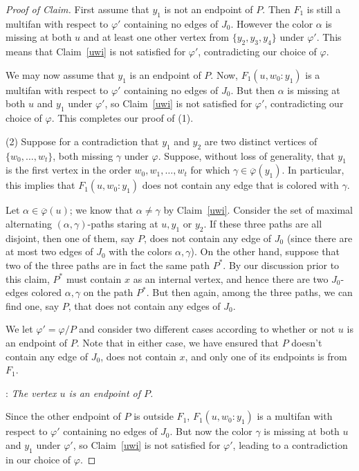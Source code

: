 \documentclass[11pt, oneside]{article}
\newcommand{\pbar}{\overline{\varphi}}
\newenvironment{proofc}{\begin{proof}[Proof of Claim]}{\end{proof}}
\begin{document}
\begin{proofc}
First assume that $y_1$ is not an endpoint of $P$. Then $F_1$ is still a multifan with respect to $\varphi'$ containing no edges of $J_0$. However the color  $\alpha$ is missing at both $u$ and at least one other vertex from $\{y_2, y_3, y_4\}$ under $\varphi'$. This means that Claim~\ref{uwi} is not satisfied for $\varphi'$, contradicting our choice of $\varphi$.

We may now assume that $y_1$ is an endpoint of $P$. Now, $F_1(u, w_0:y_1)$ is a multifan with respect to $\varphi'$ containing no edges of $J_0$. But then $\alpha$ is missing at both $u$ and $y_1$ under $\varphi'$, so Claim~\ref{uwi} is not satisfied for $\varphi'$, contradicting our choice of $\varphi$.  This completes our proof of (1).

\noindent (2) Suppose for a contradiction that $y_1$ and $y_2$ are two distinct vertices of $\{w_0, \ldots, w_t\}$, both missing $\gamma$ under $\varphi$. Suppose, without loss of generality, that $y_1$ is the first vertex 
in the order $w_0, w_1, \ldots, w_t$ for which $\gamma\in \pbar(y_1)$. In particular, this implies that $F_1(u, w_0:y_1)$ does not contain any edge that is colored with $\gamma$.  

Let $\alpha\in \pbar(u)$; we know that $\alpha\ne \gamma$ by Claim~\ref{uwi}. Consider the set of  maximal alternating $(\alpha, \gamma)$-paths staring at $u, y_1$ or $y_2$. If these three paths are all disjoint, 
then one of them, say $P$,  does not contain any edge of $J_0$ (since there are at most two edges of $J_0$ with the colors $\alpha, \gamma$). On the other hand, suppose that two of the three paths are in fact the same path $P^*$. By our discussion prior to this claim, $P^*$ must contain $x$ as an internal vertex, and hence there are two $J_0$-edges colored $\alpha, \gamma$ on the path $P^*$. But then again, among the three paths, we can find one, say $P$, that does not contain any edges of $J_0$.

We let $\varphi'=\varphi/P$ and consider two different cases according to whether or not $u$ is an endpoint of $P$. Note that in either case, we have ensured that $P$ doesn't contain any edge of $J_0$, does not contain $x$, and only one of its endpoints is from $F_1$.


:  \emph{The vertex $u$ is an endpoint of $P$.}

Since the other endpoint of $P$ is outside $F_1$, $F_1(u, w_0:y_1)$ is a multifan with respect to $\varphi'$ containing no edges of $J_0$. But now the color $\gamma$ is missing at both $u$ and $y_1$ under $\varphi'$, so Claim~\ref{uwi} is not satisfied for $\varphi'$, leading to a contradiction in our choice of $\varphi$.


\end{proofc}
\end{document}
